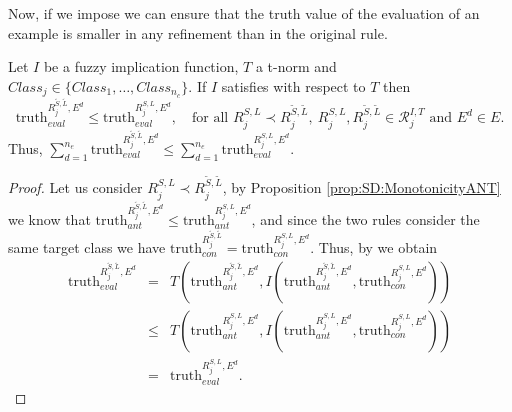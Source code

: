 Now, if we impose \MTC we can ensure that the truth value of the evaluation of an example is smaller in any refinement than in the original rule.

\begin{proposition}\label{prop:SD:MonotonicityEVAL}
	Let $I$ be a fuzzy implication function, $T$ a t-norm and $Class_j \in \{Class_1,\dots,Class_{n_c}\}$. If $I$ satisfies \MTC with respect to $T$ then
	$$ \text{truth}_{eval}^{R^{\tilde{S},\tilde{L}}_{j},E^d} \leq \text{truth}_{eval}^{R^{S,L}_j,E^d}, \quad \text{for all }  R^{S,L}_j \prec R^{\tilde{S},\tilde{L}}_{j},~ R^{S,L}_j,R^{\tilde{S},\tilde{L}}_{j}  \in \mathcal{R}^{I,T}_j \text{ and } E^d \in E.
	$$
	Thus, $\displaystyle \sum_{d=1}^{n_e}\text{truth}_{eval}^{R^{\tilde{S},\tilde{L}}_{j},E^d} \leq \sum_{d=1}^{n_e} \text{truth}_{eval}^{R^{S,L}_j,E^d}$. 
\end{proposition}

\begin{proof}
	Let us consider  $R^{S,L}_j \prec R^{\tilde{S},\tilde{L}}_{j}$, by Proposition \ref{prop:SD:MonotonicityANT} we know that $\text{truth}_{ant}^{R^{\tilde{S},\tilde{L}}_{j},E^d} \leq \text{truth}_{ant}^{R^{S,L}_j,E^d}$, and since the two rules consider the same target class we have $\text{truth}_{con}^{R^{\tilde{S},\tilde{L}}_{j}} = \text{truth}_{con}^{R^{S,L}_j,E^d}$. Thus, by \MTC we obtain
	\begin{eqnarray*}
		\text{truth}_{eval}^{R^{\tilde{S},\tilde{L}}_{j},E^d} &=&  T(\text{truth}_{ant}^{R^{\tilde{S},\tilde{L}}_{j},E^d},I(\text{truth}_{ant}^{R^{\tilde{S},\tilde{L}}_{j},E^d},\text{truth}_{con}^{R^{S,L}_j,E^d})) \\
		& \leq & T(\text{truth}_{ant}^{R^{S,L}_j,E^d},I(\text{truth}_{ant}^{R^{S,L}_j,E^d},\text{truth}_{con}^{R^{S,L}_j,E^d})) \\
		& = & \text{truth}_{eval}^{R^{S,L}_j,E^d}.
	\end{eqnarray*}
\end{proof}

